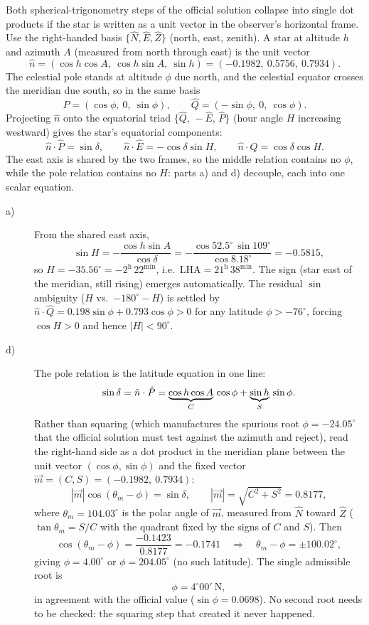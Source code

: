 Both spherical-trigonometry steps of the official solution collapse into
single dot products if the star is written as a unit vector in the
observer's horizontal frame. Use the right-handed basis
$\{\hat{N}, \hat{E}, \hat{Z}\}$ (north, east, zenith). A star at altitude
$h$ and azimuth $A$ (measured from north through east) is the unit vector
\[ \hat{n} = (\cos h\cos A,\ \cos h\sin A,\ \sin h)
   = (-0.1982,\ 0.5756,\ 0.7934). \]
The celestial pole stands at altitude $\phi$ due north, and the celestial
equator crosses the meridian due south, so in the same basis
\[ \hat{P} = (\cos\phi,\ 0,\ \sin\phi), \qquad
   \hat{Q} = (-\sin\phi,\ 0,\ \cos\phi). \]
Projecting $\hat{n}$ onto the equatorial triad
$\{\hat{Q},\, -\hat{E},\, \hat{P}\}$ (hour angle $H$ increasing westward)
gives the star's equatorial components:
\[ \hat{n}\cdot\hat{P} = \sin\delta, \qquad
   \hat{n}\cdot\hat{E} = -\cos\delta\sin H, \qquad
   \hat{n}\cdot\hat{Q} = \cos\delta\cos H. \]
The east axis is shared by the two frames, so the middle relation contains
no $\phi$, while the pole relation contains no $H$: parts a) and d)
decouple, each into one scalar equation.

\begin{description}
\item[a)] From the shared east axis,
  \[ \sin H = -\frac{\cos h\sin A}{\cos\delta}
     = -\frac{\cos 52.5^\circ\,\sin 109^\circ}{\cos 8.18^\circ}
     = -0.5815, \]
  so $H = -35.56^\circ = -2^{\mathrm{h}}\,22^{\mathrm{min}}$, i.e.\
  $\mathrm{LHA} = 21^{\mathrm{h}}\,38^{\mathrm{min}}$. The sign (star east
  of the meridian, still rising) emerges automatically. The residual
  $\sin$ ambiguity ($H$ vs.\ $-180^\circ - H$) is settled by
  $\hat{n}\cdot\hat{Q} = 0.198\sin\phi + 0.793\cos\phi > 0$ for any
  latitude $\phi > -76^\circ$, forcing $\cos H > 0$ and hence
  $|H| < 90^\circ$.

\item[d)] The pole relation is the latitude equation in one line:
  \[ \sin\delta = \hat{n}\cdot\hat{P}
     = \underbrace{\cos h\cos A}_{C}\,\cos\phi
     + \underbrace{\sin h\vphantom{\cos A}}_{S}\,\sin\phi . \]
  Rather than squaring (which manufactures the spurious root
  $\phi = -24.05^\circ$ that the official solution must test against the
  azimuth and reject), read the right-hand side as a dot product in the
  meridian plane between the unit vector $(\cos\phi, \sin\phi)$ and the
  fixed vector $\vec{m} = (C, S) = (-0.1982,\ 0.7934)$:
  \[ |\vec{m}|\cos(\theta_m - \phi) = \sin\delta, \qquad
     |\vec{m}| = \sqrt{C^2 + S^2} = 0.8177, \]
  where $\theta_m = 104.03^\circ$ is the polar angle of $\vec{m}$,
  measured from $\hat{N}$ toward $\hat{Z}$
  ($\tan\theta_m = S/C$ with the quadrant fixed by the signs of $C$ and
  $S$). Then
  \[ \cos(\theta_m - \phi) = \frac{-0.1423}{0.8177} = -0.1741
     \quad\Rightarrow\quad \theta_m - \phi = \pm 100.02^\circ, \]
  giving $\phi = 4.00^\circ$ or $\phi = 204.05^\circ$ (no such latitude).
  The single admissible root is
  \[ \phi = 4^\circ 00'\ \mathrm{N}, \]
  in agreement with the official value ($\sin\phi = 0.0698$). No second
  root needs to be checked: the squaring step that created it never
  happened.
\end{description}

